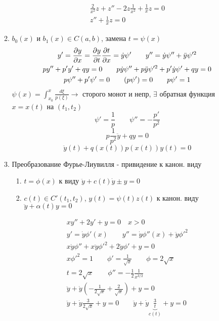 \documentclass{article}
\begin{document}
\begin{enumerate}
\begin{enumerate}
\begin{eg}
\begin{gather*}
            \frac{2}{x^2}z+z''-2z\frac{1}{x^2}+\frac{1}{x}z=0 \\ 
            z''+\frac{1}{x}z=0
          \end{gather*}
        \end{eg}
      \item $b_0(x)$ и $b_1(x) \in C(a,b)$, замена $t=\psi(x)$
        \begin{gather*}
          y'=\frac{\partial{y}}{\partial{x}}=\frac{\partial{y}}{\partial{t}}\frac{\partial{t}}{\partial{x}}=\dot{y}\psi'  \qquad
          y''=\dot{y}\psi''+\ddot y \psi'^2 \\
          py''+p'y'+qy=0 \qquad p \dot{y}\psi''+p \ddot y \psi'^{2}+p'\dot{y}\psi'+qy=0 \\ 
          p\psi''+p'\psi'=0  \qquad (p\psi')=0 \qquad p\psi'=1 \\ 
        \end{gather*}
        $\psi(x)=\int_{x_0}^{x}\frac{d\xi}{p(\xi)}\rightarrow$ сторого монот и непр,
        $\exists$ обратная функция $x=x(t)$ на $(t_1,t_2)$
        \[
          \psi'=\frac{1}{p} \qquad \psi''=-\frac{p'}{p^2}
        \]
        \[
          p\frac{1}{p^2}\ddot y + qy=0
        \]
        \[
          \ddot y(t) + q(x(t))p(x(t))y(t)=0
        \]
      \item Преобразование Фурье-Лиувилля - привидение к канон. виду
      \begin{enumerate}
        \item $t=\phi(x)$ к виду $\ddot y +c(t)\dot{y}\pm y =0$
        \item $c(t)\in C'(t_1,t_2)$, $y(t)=\psi(t)z(t)$ к канон. виду $\ddot y +\alpha(t)y=0$
      \end{enumerate}
      \begin{eg}
        \begin{gather*}
          xy''+2y'+y=0 \quad x>0 \\ 
          y'=\dot{y}\phi'(x) \qquad y''=\dot{y}\phi''(x)+\ddot y \phi'^{2} \\ 
          x \dot{y}\phi'' + x\ddot y \phi'^{2}+2\dot{y}\phi'+y=0 \\ 
          x\phi'^{2}=1 \qquad \phi'=\frac{1}{\sqrt{x}} \qquad \phi=2\sqrt{x} \\ 
          t=2\sqrt{x} \qquad \phi''=-\frac{1}{2}\frac{1}{x^{3/2}} \\ 
          \ddot y + \dot{y}\left(-\frac{1}{2\sqrt{x}}+\frac{2}{\sqrt{x}}\right)+y=0 \\ 
          \ddot y + \dot{y}\frac{3}{2\sqrt{x}}+y=0 \qquad \ddot y + \dot{y}\underbrace{\frac{3}{t}}_{c(t)}+y=0

\end{gather*}
\end{eg}
\end{enumerate}
\end{enumerate}
\end{document}
